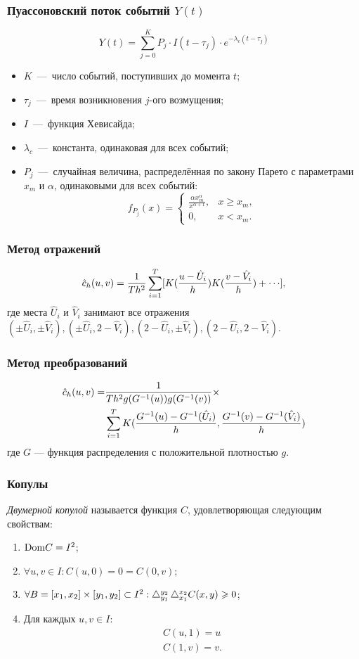 \documentclass[11pt]{beamer}
\begin{document}
\begin{frame}
\frametitle{Пуассоновский поток событий $Y(t)$}
\[Y(t) = \sum_{j = 0}^K P_j \cdot I(t - \tau_j) \cdot e^{-\lambda_c(t - \tau_j)}\]
\begin{itemize}
  \item $K$~---~число событий, поступивших до момента $t$;
  \item $\tau_j$~---~время возникновения $j$-ого возмущения;
  \item $I$~---~функция Хевисайда;
  \item $\lambda_c$~---~константа, одинаковая для всех событий;
  \item $P_j$~---~случайная величина, распределённая по закону Парето с параметрами $x_m$ и $\alpha$, одинаковыми для всех событий:
\[
f_{P_j}(x) = \begin{cases}
\frac{\alpha x_m^\alpha}{x^{\alpha+1} }, &x \geqslant x_m,\\
0, &x < x_m.
\end{cases}
\]
\end{itemize}
\end{frame}

\begin{frame}
\frametitle{Метод отражений}
\[\hat{c}_h(u, v) = \frac{1}{Th^2}\sum_{i=1}^T\sqts{K\brts{\frac{u - \hat{U}_i}{h}}K\brts{\frac{v - \hat{V}_i}{h}} + \cdots},\]
где места $\hat{U}_i$ и $\hat{V}_i$ занимают все отражения $(\pm\hat{U}_i, \pm\hat{V}_i), (\pm\hat{U}_i, 2 - \hat{V}_i), (2- \hat{U}_i, \pm\hat{V}_i), (2 - \hat{U}_i, 2- \hat{V}_i)$.
\end{frame}

\begin{frame}
\frametitle{Метод преобразований}
\begin{align}
\hat{c}_h(u, v) = &\frac{1}{Th^2g(G^{-1}(u))g(G^{-1}(v))}\times \\
&\sum_{i=1}^T K(\frac{G^{-1}(u) - G^{-1}(\hat{U}_i)}{h},\frac{G^{-1}(v) - G^{-1}(\hat{V}_i)}{h})
\end{align}
где $G$ --- функция распределения с положительной плотностью $g$.
\end{frame}

\begin{frame}
\frametitle{Копулы}
\emph{Двумерной копулой} называется функция $C$, удовлетворяющая следующим свойствам:
\begin{enumerate}
\item $\mathrm{Dom}{C} = I^2$;
\item $\forall u,v \in I : C(u, 0) = 0 = C(0, v)$;
\item $\forall B = [x_1, x_2] \times [y_1, y_2] \subset I^2 : \mathop{}\!\mathbin\bigtriangleup_{y_1}^{y_2}\mathop{}\!\mathbin\bigtriangleup_{x_1}^{x_2}C(x, y) \geqslant 0$;
\item Для каждых $u, v \in I$:
  \begin{gather}
    C(u, 1) = u \\
    C(1, v) = v.
  \end{gather}
\end{enumerate}
\end{frame}
\end{document}
